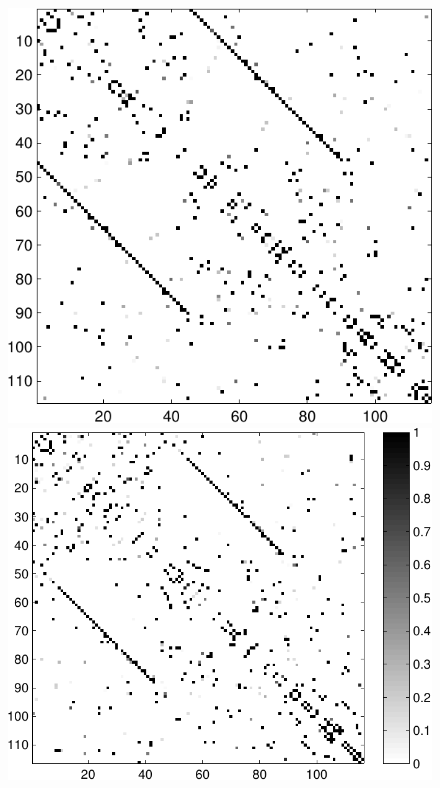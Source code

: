 \documentclass[a4paper, english]{article}
\begin{document}
\begin{figure}[h!]
\hspace{-0.5in}
\begin{minipage}[t]{1.2\textwidth}
  \centering
  \includegraphics[height=0.29\textheight]{images/new/struct_subj1-crop}
  \includegraphics[height=0.29\textheight]{images/new/struct_subj2_colorbar-crop} %

\end{minipage}
\end{figure}
\end{document}
